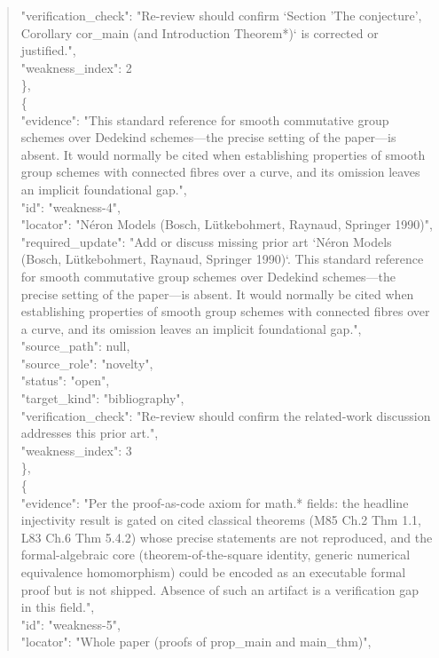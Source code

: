 \documentclass[11pt]{article}
\begin{document}
\begin{quote}
      "verification\_check": "Re-review should confirm `Section 'The conjecture', Corollary cor\_main (and Introduction Theorem*)` is corrected or justified.",\\
      "weakness\_index": 2\\
    \},\\
    \{\\
      "evidence": "This standard reference for smooth commutative group schemes over Dedekind schemes---the precise setting of the paper---is absent. It would normally be cited when establishing properties of smooth group schemes with connected fibres over a curve, and its omission leaves an implicit foundational gap.",\\
      "id": "weakness-4",\\
      "locator": "Néron Models (Bosch, Lütkebohmert, Raynaud, Springer 1990)",\\
      "required\_update": "Add or discuss missing prior art `Néron Models (Bosch, Lütkebohmert, Raynaud, Springer 1990)`. This standard reference for smooth commutative group schemes over Dedekind schemes---the precise setting of the paper---is absent. It would normally be cited when establishing properties of smooth group schemes with connected fibres over a curve, and its omission leaves an implicit foundational gap.",\\
      "source\_path": null,\\
      "source\_role": "novelty",\\
      "status": "open",\\
      "target\_kind": "bibliography",\\
      "verification\_check": "Re-review should confirm the related-work discussion addresses this prior art.",\\
      "weakness\_index": 3\\
    \},\\
    \{\\
      "evidence": "Per the proof-as-code axiom for math.* fields: the headline injectivity result is gated on cited classical theorems (M85 Ch.2 Thm 1.1, L83 Ch.6 Thm 5.4.2) whose precise statements are not reproduced, and the formal-algebraic core (theorem-of-the-square identity, generic numerical equivalence homomorphism) could be encoded as an executable formal proof but is not shipped. Absence of such an artifact is a verification gap in this field.",\\
      "id": "weakness-5",\\
      "locator": "Whole paper (proofs of prop\_main and main\_thm)",\\

\end{quote}
\end{document}
